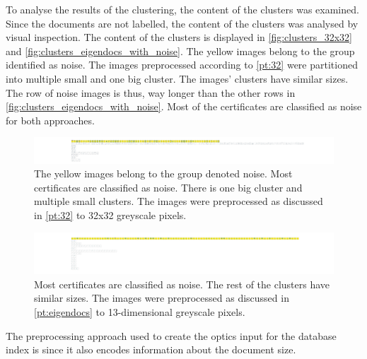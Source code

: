 To analyse the results of the clustering, the content of the clusters was examined.
Since the documents are not labelled, the content of the clusters was analysed by visual inspection.
The content of the clusters is displayed in \autoref{fig:clusters_32x32} and \autoref{fig:clusters_eigendocs_with_noise}.
The yellow images belong to the group identified as noise.
The images preprocessed according to \autoref{pt:32} were partitioned into multiple small and one big cluster.
The \eigendocs{} images' clusters have similar sizes. 
The row of noise images is thus, way longer than the other rows in \autoref{fig:clusters_eigendocs_with_noise}.
Most of the certificates are classified as noise for both approaches.


\begin{figure}[htp] %
    \centering
    \includegraphics[width=1.05\textwidth]{images/OPTICS/32x32/cluster_content_32x32.pdf}
    \caption{The yellow images belong to the group denoted noise.
    Most certificates are classified as noise.
    There is one big cluster and multiple small clusters.
    The images were preprocessed as discussed in \autoref{pt:32} to 32x32 greyscale pixels.
    }
    \label{fig:clusters_32x32}
\end{figure}

\begin{figure}[htp] %
    \centering
    \includegraphics[width=1.05\textwidth]{images/OPTICS/eigendocs/cluster_content_incl_noise_Eigendocs.pdf}
    \caption{Most certificates are classified as noise. The rest of the clusters have similar sizes.
    The images were preprocessed as discussed in \autoref{pt:eigendocs} to 13-dimensional greyscale pixels.
    }
    \label{fig:clusters_eigendocs_with_noise}
\end{figure}


The preprocessing approach used to create the \ac{optics} input for the \databaseName{} database index is \eigendocs{} since it also encodes information about the document size. 
